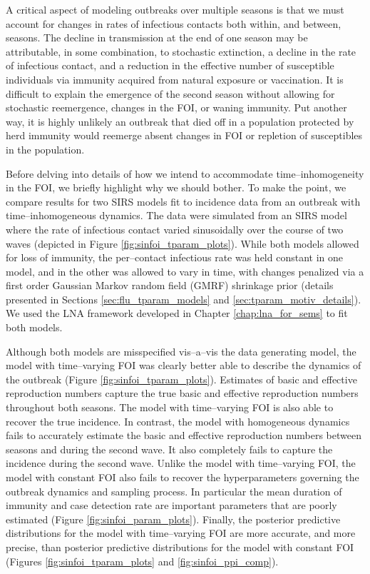 A critical aspect of modeling outbreaks over multiple seasons is that we must account for changes in rates of infectious contacts both within, and between, seasons. The decline in transmission at the end of one season may be attributable, in some combination, to stochastic extinction, a decline in the rate of infectious contact, and a reduction in the effective number of susceptible individuals via immunity acquired from natural exposure or vaccination. It is difficult to explain the emergence of the second season without allowing for stochastic reemergence, changes in the FOI, or waning immunity. Put another way, it is highly unlikely an outbreak that died off in a population protected by herd immunity would reemerge absent changes in FOI or repletion of susceptibles in the population. 

Before delving into details of how we intend to accommodate time--inhomogeneity in the FOI, we briefly highlight why we should bother. To make the point, we compare results for two SIRS models fit to incidence data from an outbreak with time--inhomogeneous dynamics. The data were simulated from an SIRS model where the rate of infectious contact varied sinusoidally over the course of two waves (depicted in Figure \ref{fig:sinfoi_tparam_plots}). While both models allowed for loss of immunity, the per--contact infectious rate was held constant in one model, and in the other was allowed to vary in time, with changes penalized via a first order Gaussian Markov random field (GMRF) shrinkage prior (details presented in Sections \ref{sec:flu_tparam_models} and \ref{sec:tparam_motiv_details}). We used the LNA framework developed in Chapter \ref{chap:lna_for_sems} to fit both models. 

Although both models are misspecified vis--a--vis the  data generating model, the model with time--varying FOI was clearly better able to describe the dynamics of the outbreak (Figure \ref{fig:sinfoi_tparam_plots}). Estimates of basic and effective reproduction numbers capture the true basic and effective reproduction numbers throughout both seasons. The model with time--varying FOI is also able to recover the true incidence. In contrast, the model with homogeneous dynamics fails to accurately estimate the basic and effective reproduction numbers between seasons and during the second wave. It also completely fails to capture the incidence during the second wave. Unlike the model with time--varying FOI, the model with constant FOI also fails to recover the hyperparameters governing the outbreak dynamics and sampling process. In particular the mean duration of immunity and case detection rate are important parameters that are poorly estimated (Figure \ref{fig:sinfoi_param_plots}). Finally, the posterior predictive distributions for the model with time--varying FOI are more accurate, and more precise, than posterior predictive distributions for the model with constant FOI (Figures \ref{fig:sinfoi_tparam_plots} and \ref{fig:sinfoi_ppi_comp}).

